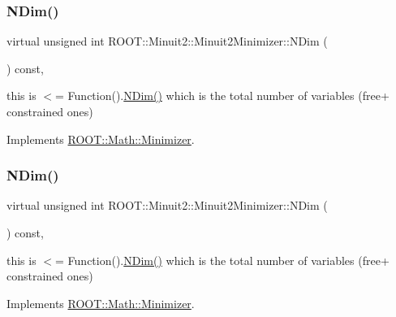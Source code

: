 \subsubsection{\texorpdfstring{NDim()}{NDim()}\hspace{0.1cm}{\footnotesize\ttfamily [1/2]}}
{\footnotesize\ttfamily virtual unsigned int R\+O\+O\+T\+::\+Minuit2\+::\+Minuit2\+Minimizer\+::\+N\+Dim (\begin{DoxyParamCaption}{ }\end{DoxyParamCaption}) const\hspace{0.3cm}{\ttfamily [inline]}, {\ttfamily [virtual]}}

this is $<$= Function().\mbox{\hyperlink{classROOT_1_1Minuit2_1_1Minuit2Minimizer_a6ed2c7d99296e222f0f43295e302eb9e}{N\+Dim()}} which is the total number of variables (free+ constrained ones) 

Implements \mbox{\hyperlink{classROOT_1_1Math_1_1Minimizer_aecb9b9ee5c6a9fd7db3196ae3ac5e335}{R\+O\+O\+T\+::\+Math\+::\+Minimizer}}.

\mbox{\label{classROOT_1_1Minuit2_1_1Minuit2Minimizer_a6ed2c7d99296e222f0f43295e302eb9e}} 
\subsubsection{\texorpdfstring{NDim()}{NDim()}\hspace{0.1cm}{\footnotesize\ttfamily [2/2]}}
{\footnotesize\ttfamily virtual unsigned int R\+O\+O\+T\+::\+Minuit2\+::\+Minuit2\+Minimizer\+::\+N\+Dim (\begin{DoxyParamCaption}{ }\end{DoxyParamCaption}) const\hspace{0.3cm}{\ttfamily [inline]}, {\ttfamily [virtual]}}

this is $<$= Function().\mbox{\hyperlink{classROOT_1_1Minuit2_1_1Minuit2Minimizer_a6ed2c7d99296e222f0f43295e302eb9e}{N\+Dim()}} which is the total number of variables (free+ constrained ones) 

Implements \mbox{\hyperlink{classROOT_1_1Math_1_1Minimizer_aecb9b9ee5c6a9fd7db3196ae3ac5e335}{R\+O\+O\+T\+::\+Math\+::\+Minimizer}}.

\mbox{\label{classROOT_1_1Minuit2_1_1Minuit2Minimizer_a0aa136c5a94d1e5c6bfcbfb98da7ad2d}} 
